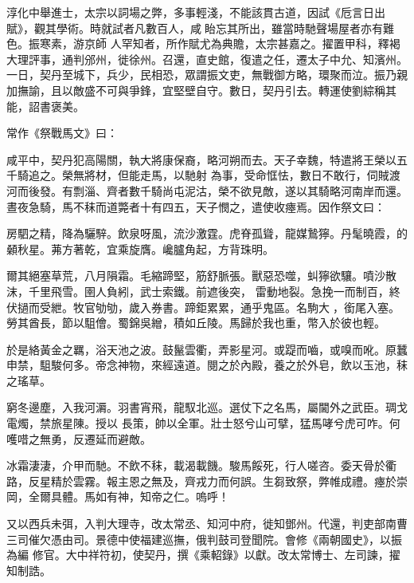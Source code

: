 \begin{pinyinscope}
 淳化中舉進士，太宗以詞場之弊，多事輕淺，不能該貫古道，因試《卮言日出賦》，觀其學術。時就試者凡數百人，咸𥈭眙忘其所出，雖當時馳聲場屋者亦有難色。振寒素，游京師
 人罕知者，所作賦尤為典贍，太宗甚嘉之。擢置甲科，釋褐大理評事，通判邠州，徙徐州。召還，直史館，復遣之任，遷太子中允、知濱州。一日，契丹至城下，兵少，民相恐，眾謂振文吏，無戰御方略，環聚而泣。振乃親加撫諭，且以敵盛不可與爭鋒，宜堅壁自守。數日，契丹引去。轉運使劉綜稱其能，詔書褒美。



 常作《祭戰馬文》曰：



 咸平中，契丹犯高陽關，執大將康保裔，略河朔而去。天子幸魏，特遣將王榮以五千騎追之。榮無將材，但能走馬，以馳射
 為事，受命恇怯，數日不敢行，伺賊渡河而後發。有剽淄、齊者數千騎尚屯泥沽，榮不欲見敵，遂以其騎略河南岸而還。晝夜急騎，馬不秣而道斃者十有四五，天子憫之，遣使收瘞焉。因作祭文曰：



 房駟之精，降為驪騂。飲泉呀風，流沙激霆。虎脊孤聳，龍媒鷙獰。丹髦曉霞，的顙秋星。茀方著乾，宜乘旋膺。巉臚角起，方背珠明。



 爾其絕塞草荒，八月隕霜。毛縮蹄堅，筋舒脈張。獸惡恐噬，虯獰欲驤。噴沙散沫，千里飛雪。圉人負紖，武士索鐵。前遮後突，
 雷動地裂。急挽一而制百，終伏撾而受紲。牧官劬劬，歲入券書。蹄鉅累累，通乎鬼區。名駒大𩡺，銜尾入塞。勞其酋長，節以駔儈。蜀錦吳繒，積如丘陵。馬歸於我也重，幣入於彼也輕。



 於是絡黃金之羈，浴天池之波。鼓鬣雲衢，弄影星河。或踶而嚙，或嗅而吪。原蠶申禁，駔駿何多。帝念神物，來經遠道。閱之於內殿，養之於外皂，飲以玉池，秣之瑤草。



 窮冬邊塵，入我河漘。羽書宵飛，龍馭北巡。選仗下之名馬，屬閫外之武臣。琱戈電燭，禁旅星陳。授以
 長策，帥以全軍。壯士怒兮山可擘，猛馬哮兮虎可咋。何嚄唶之無勇，反遷延而避敵。



 冰霜淒淒，介甲而馳。不飲不秣，載渴載饑。駿馬餒死，行人嗟咨。委天骨於衢路，反星精於雲霧。報主恩之無及，齊戎力而何誤。生芻致祭，弊帷成禮。瘞於崇岡，全爾具體。馬如有神，知帝之仁。嗚呼！



 又以西兵未弭，入判大理寺，改太常丞、知河中府，徙知鄧州。代還，判吏部南曹三司催欠憑由司。景德中使福建巡撫，俄判鼓司登聞院。會修《兩朝國史》，以振為編
 修官。大中祥符初，使契丹，撰《乘軺錄》以獻。改太常博士、左司諫，擢知制誥。




\end{pinyinscope}
